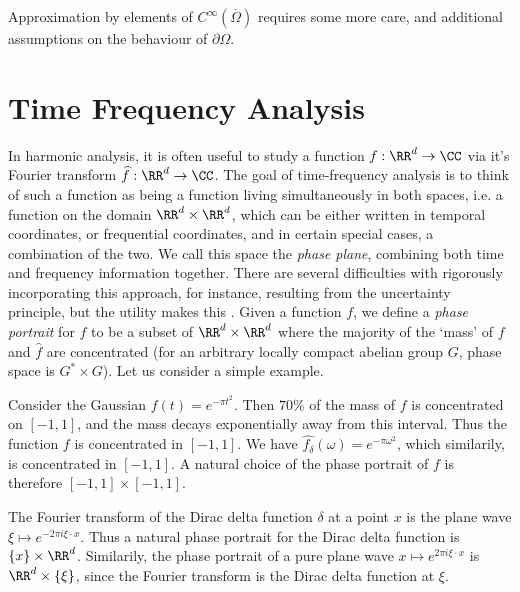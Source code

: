 Approximation by elements of $C^\infty(\overline{\Omega})$ requires some more care, and additional assumptions on the behaviour of $\partial \Omega$.













\chapter{Time Frequency Analysis}

In harmonic analysis, it is often useful to study a function $f: \RR^d \to \CC$ via it's Fourier transform $\widehat{f}: \RR^d \to \CC$. The goal of time-frequency analysis is to think of such a function as being a function living simultaneously in both spaces, i.e. a function on the domain $\RR^d \times \RR^d$, which can be either written in temporal coordinates, or frequential coordinates, and in certain special cases, a combination of the two. We call this space the \emph{phase plane}, combining both time and frequency information together. There are several difficulties with rigorously incorporating this approach, for instance, resulting from the uncertainty principle, but the utility makes this . Given a function $f$, we define a \emph{phase portrait} for $f$ to be a subset of $\RR^d \times \RR^d$ where the majority of the `mass' of $f$ and $\widehat{f}$ are concentrated (for an arbitrary locally compact abelian group $G$, phase space is $G^* \times G$). Let us consider a simple example.

\begin{example}
  Consider the Gaussian $f(t) = e^{- \pi t^2}$. Then $70\%$ of the mass of $f$ is concentrated on $[-1,1]$, and the mass decays exponentially away from this interval. Thus the function $f$ is concentrated in $[-1,1]$. We have $\widehat{f_\delta}(\omega) = e^{- \pi \omega^2}$, which similarily, is concentrated in $[-1,1]$. A natural choice of the phase portrait of $f$ is therefore $[-1,1] \times [-1,1]$.
\end{example}

\begin{example}
  The Fourier transform of the Dirac delta function $\delta$ at a point $x$ is the plane wave $\xi \mapsto e^{- 2 \pi i \xi \cdot x}$. Thus a natural phase portrait for the Dirac delta function is $\{ x \} \times \RR^d$. Similarily, the phase portrait of a pure plane wave $x \mapsto e^{2 \pi i \xi \cdot x}$ is $\RR^d \times \{ \xi \}$, since the Fourier transform is the Dirac delta function at $\xi$.
\end{example}

